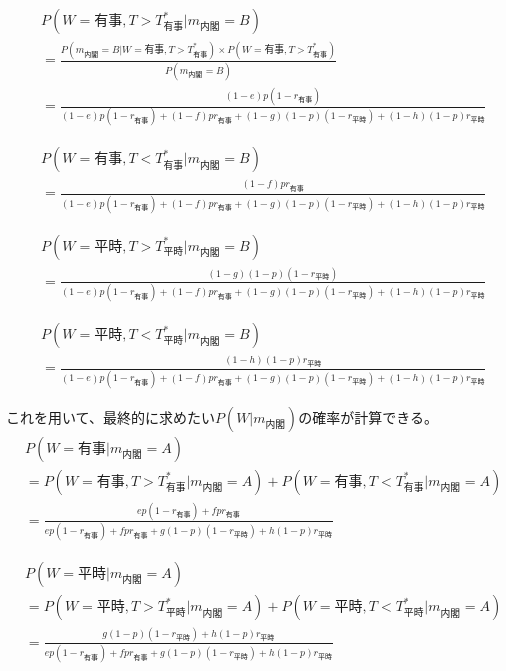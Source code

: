\documentclass[main.tex]{subfiles}
\begin{document}
\begin{align*}
    & P(W=有事, T>T^*_{有事} | m_{内閣}=B)\\[0.5em]
    &= \frac{ P(m_{内閣}=B| W={有事}, T>T^*_{有事}) × P(W={有事}, T>T^*_{有事}) }{ P(m_{内閣}=B) } \\[1em]
    &= \frac{ (1-e)p(1-r_{有事}) }{ (1-e)p(1-r_{有事}) + (1-f)pr_{有事} + (1-g)(1-p)(1-r_{平時}) + (1-h)(1-p)r_{平時} }
\end{align*}

\begin{align*}
    & P(W=有事, T<T^*_{有事} | m_{内閣}=B)\\[0.5em]
    &= \frac{ (1-f)pr_{有事} }{ (1-e)p(1-r_{有事}) + (1-f)pr_{有事} + (1-g)(1-p)(1-r_{平時}) + (1-h)(1-p)r_{平時} }
\end{align*}

\begin{align*}
    & P(W=平時, T>T^*_{平時} | m_{内閣}=B)\\[0.5em]
    &= \frac{ (1-g)(1-p)(1-r_{平時}) }{ (1-e)p(1-r_{有事}) + (1-f)pr_{有事} + (1-g)(1-p)(1-r_{平時}) + (1-h)(1-p)r_{平時} }
\end{align*}

\begin{align*}
    & P(W=平時, T<T^*_{平時} | m_{内閣}=B)\\[0.5em]
    &= \frac{ (1-h)(1-p)r_{平時} }{ (1-e)p(1-r_{有事}) + (1-f)pr_{有事} + (1-g)(1-p)(1-r_{平時}) + (1-h)(1-p)r_{平時} }
\end{align*}


これを用いて、最終的に求めたい$P(W|m_{内閣})$の確率が計算できる。
\begin{align*}
    & P(W=有事 | m_{内閣}=A)\\[0.5em]
    &= P(W=有事, T>T^*_{有事} | m_{内閣}=A) + P(W=有事, T<T^*_{有事} | m_{内閣}=A)\\[0.5em]
    &= \frac{ ep(1-r_{有事}) +  fpr_{有事}  }{ ep(1-r_{有事}) + fpr_{有事} + g(1-p)(1-r_{平時}) + h(1-p)r_{平時} }
\end{align*}

\begin{align*}
    & P(W=平時 | m_{内閣}=A)\\[0.5em]
    &= P(W=平時, T>T^*_{平時} | m_{内閣}=A) + P(W=平時, T<T^*_{平時} | m_{内閣}=A)\\[0.5em]
    &= \frac{  g(1-p)(1-r_{平時}) + h(1-p)r_{平時}  }{ ep(1-r_{有事}) + fpr_{有事} + g(1-p)(1-r_{平時}) + h(1-p)r_{平時} }
\end{align*}
\end{document}
